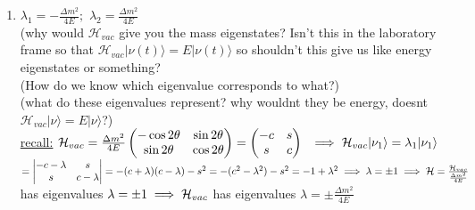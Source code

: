 \documentclass[12pt]{amsart}
\begin{document}
\begin{enumerate}
\item \underline{$\lambda_1= - \frac{\Delta m^2}{4 E};\,\, \lambda_2 = \frac{\Delta m^2}{4 E}$}\\
(why would $\mathcal{H}_{vac}$ give you the mass eigenstates? Isn't this in the laboratory frame so that $\mathcal{H}_{vac}|\nu(t) \rangle = E | \nu(t) \rangle$ so shouldn't this give us like energy eigenstates or something?\\
(How do we know which eigenvalue corresponds to what?)\\
(what do these eigenvalues represent? why wouldnt they be energy, doesnt $\mathcal{H}_{vac} | \nu \rangle = E |\nu \rangle$?)\\
\underline{recall:} $\mathcal{H}_{vac} = \frac{\Delta m^2}{4 E} \begin{pmatrix} - \cos 2 \theta & \sin 2 \theta \\ \sin 2 \theta & \cos 2 \theta \end{pmatrix} = \begin{pmatrix} - c & s \\ s & c \end{pmatrix}\\\
\implies \mathcal{H}_{vac} | \nu_1 \rangle = \lambda_1 | \nu_1 \rangle$\\
$= \begin{vmatrix} - c - \lambda & s \\ s & c- \lambda \end{vmatrix} = - ( c + \lambda)( c- \lambda) - s^2\\
= - ( c^2 - \lambda^2) - s^2 = - 1 + \lambda^2 \implies \lambda = \pm 1\\
\implies \mathcal{H} = \frac{\mathcal{H}_{vac}}{\frac{\Delta m^2}{4 E}}$ has eigenvalues $\lambda= \pm 1\\
\implies \mathcal{H}_{vac}$ has eigenvalues $\lambda = \pm \frac{\Delta m^2}{4 E}$\\


\hdashrule[0.5ex][c]{\linewidth}{0.5pt}{1.5mm}



\end{enumerate}
\end{document}
